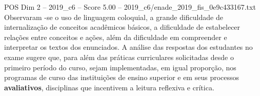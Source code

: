 \begin{textsample}{POS Dim 2 – 2019\_c6 – Score 5.00 – 2019\_c6/enade\_2019\_fis\_0e9c433167.txt}
Observaram -se o uso de linguagem coloquial, a grande dificuldade de internalização de conceitos acadêmicos básicos, a dificuldade de estabelecer relações entre conceitos e ações, além da dificuldade em compreender e interpretar os textos dos enunciados.
A análise das respostas dos estudantes no exame sugere que, para além das práticas curriculares solicitadas desde o primeiro período do curso, sejam implementadas, em igual proporção, nos programas de curso das instituições de ensino superior e em seus processos \textbf{avaliativos}, disciplinas que incentivem a leitura reflexiva e crítica.

\end{textsample}
